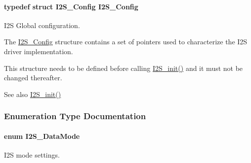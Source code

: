 \paragraph[{I2\+S\+\_\+\+Config}]{\setlength{\rightskip}{0pt plus 5cm}typedef struct {\bf I2\+S\+\_\+\+Config}  {\bf I2\+S\+\_\+\+Config}}\label{_i2_s_8h_a702f29a736651810df453469ff616606}


I2\+S Global configuration. 

The \hyperlink{struct_i2_s___config}{I2\+S\+\_\+\+Config} structure contains a set of pointers used to characterize the I2\+S driver implementation.

This structure needs to be defined before calling \hyperlink{_i2_s_8h_a79e8fdf40ee80c49b2cac09a3e428a82}{I2\+S\+\_\+init()} and it must not be changed thereafter.

\begin{DoxySeeAlso}{See also}
\hyperlink{_i2_s_8h_a79e8fdf40ee80c49b2cac09a3e428a82}{I2\+S\+\_\+init()} 
\end{DoxySeeAlso}


\subsubsection{Enumeration Type Documentation}
\paragraph[{I2\+S\+\_\+\+Data\+Mode}]{\setlength{\rightskip}{0pt plus 5cm}enum {\bf I2\+S\+\_\+\+Data\+Mode}}\label{_i2_s_8h_a120b8555bc048186bbd436dbdbb5b405}


I2\+S mode settings. 


